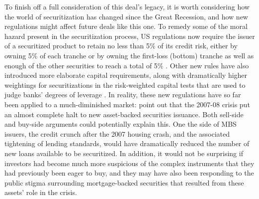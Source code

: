 \documentclass[12pt]{article}
\begin{document}
To finish off a full consideration of this deal’s legacy, it is worth considering how the world of securitization has changed since the Great Recession, and how new regulations might affect future deals like this one. To remedy some of the moral hazard present in the securitization process, US regulations now require the issuer of a securitized product to retain no less than 5\% of its credit risk, either by owning 5\% of each tranche or by owning the first-loss (bottom) tranche as well as enough of the other securities to reach a total of 5\% \parencite{scheicher17}. Other new rules have also introduced more elaborate capital requirements, along with dramatically higher weightings for securitizations in the risk-weighted capital tests that are used to judge banks’ degrees of leverage \parencite{scheicher17}. In reality, these new regulations have so far been applied to a much-diminished market: \textcite{gorton12} point out that the 2007-08 crisis put an almost complete halt to new asset-backed securities issuance. Both sell-side and buy-side arguments could potentially explain this. One the side of MBS issuers, the credit crunch after the 2007 housing crash, and the associated tightening of lending standards, would have dramatically reduced the number of new loans available to be securitized. In addition, it would not be surprising if investors had become much more suspicious of the complex instruments that they had previously been eager to buy, and they may have also been responding to the public stigma surrounding mortgage-backed securities that resulted from these assets’ role in the crisis.
\end{document}

